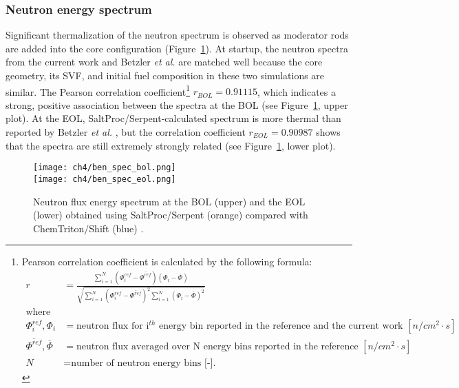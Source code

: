 \subsubsection{Neutron energy spectrum}
Significant thermalization of the neutron spectrum is observed as moderator 
rods are added into the core configuration 
(Figure~\ref{fig:ben-spectrum-bol}). At startup, the neutron spectra from the 
current work and Betzler \emph{et al.} are matched well because the core 
geometry, its \gls{SVF}, and initial fuel composition in these two simulations 
are similar. The Pearson correlation coefficient\footnote{Pearson correlation 
coefficient is calculated by the following formula:
	\begin{align}
	r &= \frac{\sum_{i=1}^{N} 
		(\Phi_i^{ref}-\overline{\Phi^{ref}})(\Phi_i-\overline{\Phi})}
	{\sqrt{\sum_{i=1}^{N} (\Phi_i^{ref}-\overline{\Phi^{ref}})^2 
			\sum_{i=1}^{N} 
			(\Phi_i-\overline{\Phi})^2}}\\
	\mbox{where} \nonumber\\
	\Phi_i^{ref},\Phi_i &= \mbox{neutron flux for i$^{th}$ energy bin 
		reported in the reference and the current work $[n/cm^2\cdot s]$} 
	\nonumber\\
	\overline{\Phi^{ref}}, \overline{\Phi} &= \mbox{neutron flux averaged over 
		N energy bins reported in the reference and current work $[n/cm^2\cdot 
		s]$} 
	\nonumber\\
	N &= \mbox{number of neutron energy bins [-].}
	\nonumber
	\end{align}}
$r_{BOL}=0.91115$, which indicates a strong, positive association between the 
spectra at the \gls{BOL} (see Figure~\ref{fig:ben-spectrum-bol}, upper plot).
At the \gls{EOL}, SaltProc/Serpent-calculated spectrum is more thermal than 
reported by Betzler \emph{et al.} \cite{betzler_assessment_2017-1}, but the
correlation coefficient $r_{EOL}=0.90987$ shows that the spectra are still 
extremely strongly related (see Figure~\ref{fig:ben-spectrum-bol}, lower 
plot). 
\begin{figure}[htbp!] %
	\centering
	\texttt{[image: ch4/ben\_spec\_bol.png]}\\
	\vspace{-12mm}
	\hspace{0.5mm}
	\texttt{[image: ch4/ben\_spec\_eol.png]}
	\vspace{-3mm}
	\caption{Neutron flux energy spectrum at the BOL (upper) and the EOL 
		(lower) obtained using SaltProc/Serpent (orange) compared with 
		ChemTriton/Shift (blue) \cite{betzler_assessment_2017-1}.}
	\label{fig:ben-spectrum-bol}
\end{figure}

